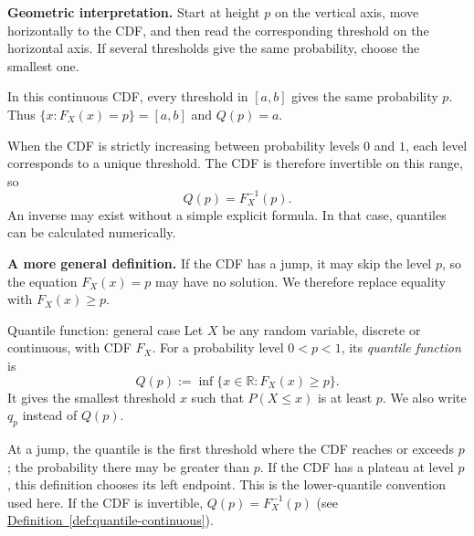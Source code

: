 \documentclass[a4paper,12pt,oneside]{report}
\begin{document}
\textbf{Geometric interpretation.}
Start at height $p$ on the vertical axis, move horizontally to the
CDF, and then read the corresponding threshold on the horizontal
axis. If several thresholds give the same probability, choose
the smallest one.
\begin{center}
\end{center}
In this continuous CDF, every threshold in $[a,b]$ gives the same
probability $p$. Thus $\{x:F_X(x)=p\}=[a,b]$ and $Q(p)=a$.

When the CDF is strictly increasing between probability levels
$0$ and $1$, each level corresponds to a unique threshold. The CDF
is therefore invertible on this range, so
\[
  \boxed{Q(p)=F_X^{-1}(p).}
\]
An inverse may exist without a simple explicit formula. In that
case, quantiles can be calculated numerically.

\textbf{A more general definition.}
If the CDF has a jump, it may skip the level $p$, so the equation
$F_X(x)=p$ may have no solution. We therefore replace equality
with $F_X(x)\geq p$.

\begin{frameddefn}{Quantile function: general case}
\label{def:quantile-general}
Let $X$ be any random variable, discrete or continuous, with CDF
$F_X$. For a probability level $0<p<1$, its \emph{quantile function} is
\[
  Q(p):=\inf\{x\in\mathbb R:F_X(x)\geq p\}.
\]
It gives the smallest threshold $x$ such that
$P(X\leq x)$ is at least $p$. We also write $q_p$ instead of $Q(p)$.
\end{frameddefn}

At a jump, the quantile is the first threshold where the CDF
reaches or exceeds $p$; the probability there may be greater than $p$.
If the CDF has a plateau at level $p$, this definition chooses its
left endpoint. This is the lower-quantile convention used here.
If the CDF is invertible, $Q(p)=F_X^{-1}(p)$ (see
\hyperref[def:quantile-continuous]{Definition~\ref*{def:quantile-continuous}}).
\end{document}
